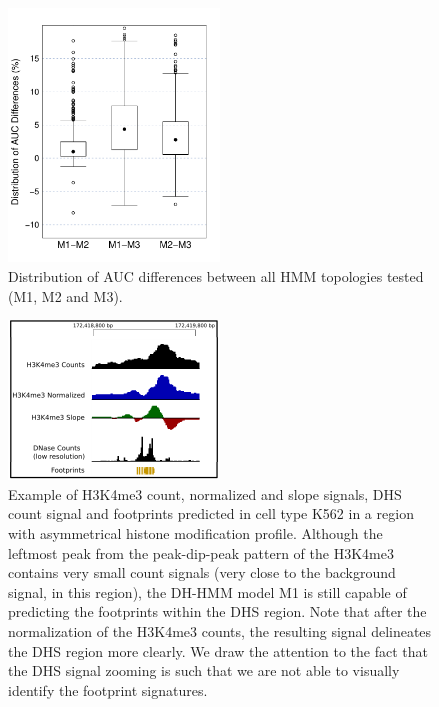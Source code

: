 \documentclass{bioinfo}
\begin{document}
\begin{figure}[t]
\centering
     \includegraphics[width=0.5\textwidth]{Figs/ModelType}
\caption{Distribution of AUC differences between all HMM topologies tested (M1, M2 and M3).}
\label{fig:hmm.topologies.box}
\end{figure}

\begin{figure}[t]
\centering
     \includegraphics[width=0.5\textwidth]{Figs/Assymetric}
\caption{Example of H3K4me3 count, normalized and slope signals, DHS count signal and footprints predicted in cell type K562 in a region with asymmetrical histone modification profile. Although the leftmost peak from the peak-dip-peak pattern of the H3K4me3 contains very small count signals (very close to the background signal, in this region), the DH-HMM model M1 is still capable of predicting the footprints within the DHS region. Note that after the normalization of the H3K4me3 counts, the resulting signal delineates the DHS region more clearly. We draw the attention to the fact that the DHS signal zooming is such that we are not able to visually identify the footprint signatures.}
\label{fig:asymmetric}
\end{figure}
\end{document}
